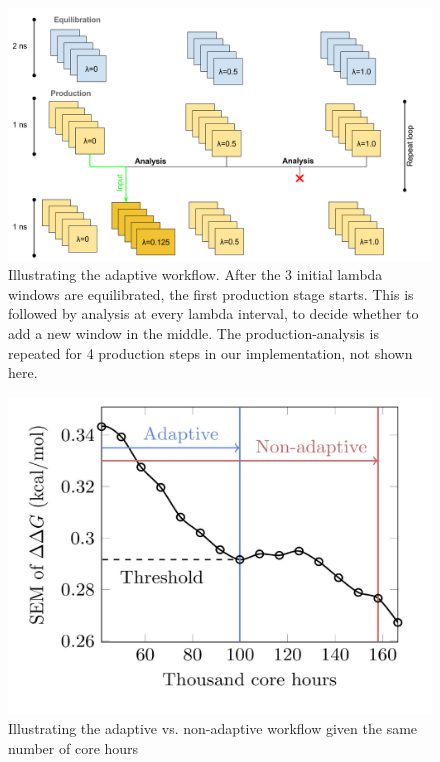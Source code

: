 \begin{figure}
  \centering
   \includegraphics[width=\columnwidth]{figures/Adaptive_TIES_1.png}
  \caption{Illustrating the adaptive workflow. After the 3 initial lambda 
  windows are equilibrated, the first production stage starts. 
  This is followed by analysis at every lambda interval, to decide whether 
  to add a new window in the middle. The production-analysis is repeated 
  for 4 production steps in our implementation, not shown here.}
\label{fig:adaptive_TIES}
\end{figure}



\begin{figure}
  \centering
    \includegraphics[width=\columnwidth]{figures/adaptive_vs_nonadaptive_pseudo.pdf}
    \caption{Illustrating the adaptive vs. non-adaptive workflow given the
    same number of core hours}
\label{fig:adaptive_vs_nonadaptive_TIES}
\end{figure}

